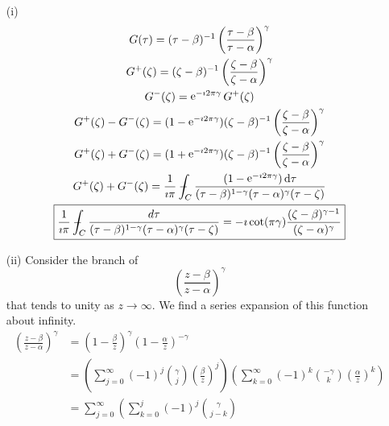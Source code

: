 \begin{Solution}
  \begin{itemize}
  \item[(i)]
    \begin{gather*}
      G(\tau) = (\tau - \beta)^{-1} \left( 
        \frac{\tau-\beta}{\tau-\alpha} \right)^\gamma \\
      G^+(\zeta) = (\zeta - \beta)^{-1}
      \left( \frac{\zeta-\beta}{\zeta-\alpha} \right)^\gamma \\
      G^-(\zeta) = \e^{-\imath 2 \pi \gamma} G^+(\zeta) \\
      G^{+}(\zeta) - G^-(\zeta) = (1 - \e^{-\imath 2 \pi \gamma}) (\zeta - \beta)^{-1}
      \left( \frac{\zeta-\beta}{\zeta-\alpha} \right)^\gamma \\
      G^{+}(\zeta) + G^-(\zeta) = (1 + \e^{-\imath 2 \pi \gamma}) (\zeta - \beta)^{-1}
      \left( \frac{\zeta-\beta}{\zeta-\alpha} \right)^\gamma \\
      G^{+}(\zeta) + G^-(\zeta) = \frac{1}{\imath \pi} \pv\int_C 
      \frac{(1 - \e^{-\imath 2 \pi \gamma}) \,\dd \tau }{ (\tau - \beta)^{1-\gamma}
        (\tau - \alpha)^\gamma (\tau - \zeta) } \\
      \boxed{
        \frac{1}{\imath \pi} \pv\int_C 
        \frac{d \tau }{ (\tau - \beta)^{1-\gamma}
          (\tau - \alpha)^\gamma (\tau - \zeta) } 
        = - \imath \cot(\pi \gamma) \frac{ (\zeta-\beta)^{\gamma-1} }
        { (\zeta-\alpha)^\gamma }
        }
    \end{gather*}
  \item[(ii)]
    Consider the branch of 
    \[
    \left( \frac{z-\beta}{z-\alpha} \right)^\gamma
    \]
    that tends to unity as $z \to \infty$.  We find a series expansion of
    this function about infinity.
    \begin{align*}
      \left( \frac{z-\beta}{z-\alpha} \right)^\gamma
      &= \left( 1 - \frac{\beta}{z} \right)^\gamma
      \left( 1 - \frac{\alpha}{z} \right)^{-\gamma} \\
      &= \left( \sum_{j = 0}^\infty (-1)^j \binom{\gamma}{j} 
        \left( \frac{\beta}{z} \right)^j \right)
      \left( \sum_{k = 0}^\infty (-1)^k \binom{-\gamma}{k} 
        \left( \frac{\alpha}{z} \right)^k \right) \\
      &= \sum_{j = 0}^\infty \left( \sum_{k=0}^j (-1)^j \binom{\gamma}{j-k}

\end{align*}
\end{itemize}
\end{Solution}
